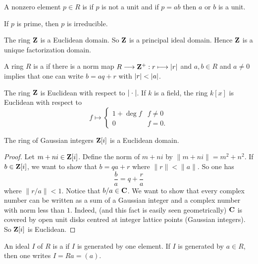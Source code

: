 \documentclass[11pt, oneside,margin=1in]{article}
\begin{document}
\begin{definition}
A nonzero element $p\in R$ is  if $p$ is not a unit and if $p=ab$ then $a$ or $b$ is a unit.
\end{definition}

If $p$ is prime, then $p$ is irreducible.

\begin{proposition}
The ring $\mathbf Z$ is a Euclidean domain. So $\mathbf Z$ is a principal ideal domain. Hence $\mathbf Z$ is a unique factorization domain.
\end{proposition}

\begin{definition}
A ring $R$ is a  if there is a norm map $R\longrightarrow \mathbf Z^+ : r\longmapsto \left \lvert r \right \rvert$ and $a,b\in R$ and $a\ne 0$ implies that one can write $b = aq + r$ with $\left \lvert r \right \rvert < \left \lvert a \right \rvert$.
\end{definition}

\begin{example}
The ring $\mathbf Z$ is Euclidean with respect to $\left \lvert \: \cdot\: \right \rvert$. If $k$ is a field, the ring $k[x]$ is Euclidean with respect to $$f\longmapsto
\begin{cases}
1 + \deg f&f\ne 0\\
0 & f=0.
\end{cases}
$$
\end{example}

\begin{proposition}
The ring of Gaussian integers $\mathbf Z[i]$ is a Euclidean domain.
\end{proposition}
\begin{proof}
Let $m+ni\in \mathbf Z[i]$. Define the norm of $m+ni$ by $\|m+ni\| = m^2 + n^2$. If $b\in \mathbf Z[i]$, we want to show that $b=qa+r$ where $\| r\|  < \| a\| $. So one has
$$
\frac{b}{a} = q + \frac{r}{a}
$$
where $\| r/a\|  < 1$. Notice that $b/a \in \mathbf C$. We want to show that every complex number can be written as a sum of a Gaussian integer and a complex number with norm less than $1$. Indeed, (and this fact is easily seen geometrically) $\mathbf C$ is covered by open unit disks centred at integer lattice points (Gaussian integers). So $\mathbf Z[i]$ is Euclidean.
\end{proof}
\begin{definition}
An ideal $I$ of $R$ is a  if $I$ is generated by one element. If $I$ is generated by $a\in R$, then one writes $I = Ra = (a)$.
\end{definition}
\end{document}
